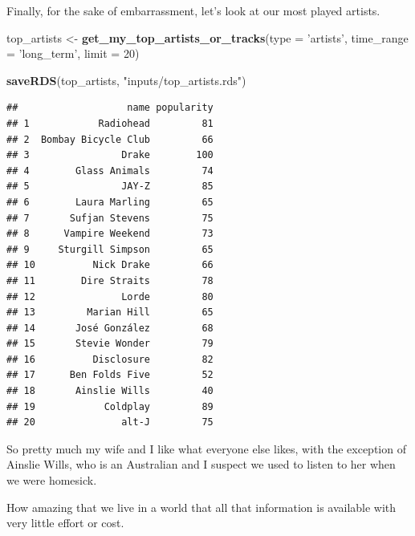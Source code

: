 \documentclass[
]{book}
\newenvironment{Shaded}{\begin{snugshade}}{\end{snugshade}}
\newcommand{\DataTypeTok}[1]{\textcolor[rgb]{0.13,0.29,0.53}{#1}}
\newcommand{\DecValTok}[1]{\textcolor[rgb]{0.00,0.00,0.81}{#1}}
\newcommand{\KeywordTok}[1]{\textcolor[rgb]{0.13,0.29,0.53}{\textbf{#1}}}
\newcommand{\NormalTok}[1]{#1}
\newcommand{\OperatorTok}[1]{\textcolor[rgb]{0.81,0.36,0.00}{\textbf{#1}}}
\newcommand{\StringTok}[1]{\textcolor[rgb]{0.31,0.60,0.02}{#1}}
\begin{document}
Finally, for the sake of embarrassment, let's look at our most played artists.

\begin{Shaded}
\begin{Highlighting}[]
\NormalTok{top_artists <-}\StringTok{ }\KeywordTok{get_my_top_artists_or_tracks}\NormalTok{(}\DataTypeTok{type =} \StringTok{'artists'}\NormalTok{, }\DataTypeTok{time_range =} \StringTok{'long_term'}\NormalTok{, }\DataTypeTok{limit =} \DecValTok{20}\NormalTok{)}

\KeywordTok{saveRDS}\NormalTok{(top_artists, }\StringTok{"inputs/top_artists.rds"}\NormalTok{)}
\end{Highlighting}
\end{Shaded}

\begin{Shaded}
\end{Shaded}

\begin{verbatim}
##                   name popularity
## 1            Radiohead         81
## 2  Bombay Bicycle Club         66
## 3                Drake        100
## 4        Glass Animals         74
## 5                JAY-Z         85
## 6        Laura Marling         65
## 7       Sufjan Stevens         75
## 8      Vampire Weekend         73
## 9     Sturgill Simpson         65
## 10          Nick Drake         66
## 11        Dire Straits         78
## 12               Lorde         80
## 13         Marian Hill         65
## 14       José González         68
## 15       Stevie Wonder         79
## 16          Disclosure         82
## 17      Ben Folds Five         52
## 18       Ainslie Wills         40
## 19            Coldplay         89
## 20               alt-J         75
\end{verbatim}

So pretty much my wife and I like what everyone else likes, with the exception of Ainslie Wills, who is an Australian and I suspect we used to listen to her when we were homesick.

How amazing that we live in a world that all that information is available with very little effort or cost.
\end{document}
